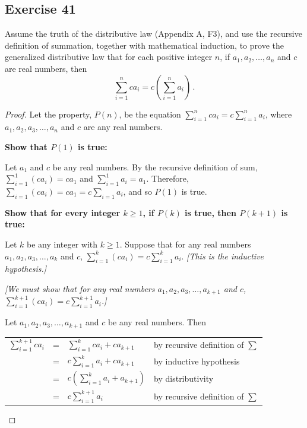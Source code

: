 \documentclass[14pt]{extarticle}
\newcommand{\dps}{\displaystyle}
\newcommand{\cy}{\color{cyan}}
\begin{document}
\subsection{Exercise 41}
Assume the truth of the distributive law (Appendix A, F3), and use the recursive definition of summation, together with mathematical induction, to prove the generalized distributive law that for each positive integer $n$, if $a_1, a_2, \ldots, a_n$ and $c$ are real numbers, then
\[
\sum_{i = 1}^{n} c a_i = c\left(\sum_{i = 1}^{n} a_i \right)\,.
\]
\begin{proof}
Let the property, $P(n)$, be the equation \(\dps \sum_{i=1}^n c a_i = c\sum_{i=1}^n a_i\), where \(a_1, a_2, a_3, 
\ldots, a_n\) and $c$ are any real numbers.

{\bf Show that $P(1)$ is true:}

Let $a_1$ and $c$ be any real numbers. By the recursive
definition of sum, \(\dps \sum_{i=1}^1 (c a_i) = c a_1\) 
and \(\dps \sum_{i=1}^1 a_i = a_1\). Therefore, \(\dps \sum_{i=1} (c a_i) = c a_1 = c \sum_{i=1} a_i\), 
and so $P(1)$ is true.

{\bf Show that for every integer \(k \geq 1\), if $P(k)$ is true, then \(P(k + 1)\) is true:}

Let $k$ be any integer with \(k \geq 1\). Suppose that for any real numbers \(a_1, a_2, a_3, \ldots, a_k\) and $c$, 
\(\dps \sum_{i=1}^k (c a_i) = c \sum_{i=1}^k a_i\). {\it [This is the inductive hypothesis.]}

{\it [We must show that for any real numbers \(a_1, a_2, a_3, \ldots, a_{k+1}\) and $c$, \(\dps \sum_{i=1}^{k+1} 
(c a_i) = c\sum_{i=1}^{k+1} a_i\).]}

Let \(a_1, a_2, a_3, \ldots, a_{k+1}\) and $c$ be any real numbers. Then

\begin{center}
\begin{tabular}{rcll}
\(\dps \sum_{i=1}^{k+1} c a_i\) & = & \(\dps \sum_{i=1}^k c a_i + c a_{k+1}\) & {\cy by recursive definition of $\sum$} \\
& = & \(\dps c \sum_{i=1}^k a_i + c a_{k+1}\) & {\cy by inductive hypothesis} \\
& = & \(\dps c \left(\sum_{i=1}^k a_i + a_{k+1}\right)\) & {\cy by distributivity} \\
& = & \(\dps c \sum_{i=1}^{k+1} a_i\) & {\cy by recursive definition of $\sum$}
\end{tabular}
\end{center}
\end{proof}
\end{document}
